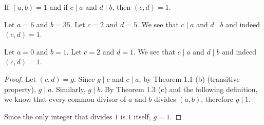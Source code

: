 \begin{exercise}{1}
  If \( (a, b) = 1 \) and if \( c \mid a \) and \( d \mid b \), then
  \( (c, d) = 1 \).
\end{exercise}

\begin{example}
  Let \( a = 6 \) and \( b = 35 \). Let \( c = 2 \) and \( d = 5 \). We
  see that \( c \mid a \) and \( d \mid b \) and indeed \( (c, d) = 1
  \).
\end{example}

\begin{example}
  Let \( a = 0 \) and \( b = 1 \). Let \( c = 2 \) and \( d = 1 \). We
  see that \( c \mid a \) and \( d \mid b \) and indeed \( (c, d) = 1 \).
\end{example}

\begin{proof}
  Let \( (c, d) = g \). Since \( g \mid c \) and \( c \mid a \), by
  Theorem 1.1 (b) (transitive property), \( g \mid a \). Similarly, \( g
  \mid b \). By Theorem 1.3 (c) and the following definition, we know
  that every common divisor of \( a \) and \( b \) divides \( (a, b) \),
  therefore \( g \mid 1 \).

  Since the only integer that divides \( 1 \) is \( 1 \) itself, \( g =
  1 \).
\end{proof}
